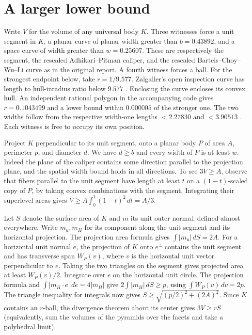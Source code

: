 \section{A larger lower bound}
Write $V$ for the volume of any universal body $K$. Three witnesses force
a unit segment in $K$, a planar curve of planar width greater than
$b=0.43892$, and a space curve of width greater than $w=0.25607$.
These are respectively the segment, the rescaled Adhikari--Pitman caliper,
and the rescaled Bartels--Choy--Wu--Li curve as in the original report.
A fourth witness forces a ball. For the strongest endpoint below, take $r=1/9.577$. Zalgaller's open inspection curve has length to hull-inradius ratio below $9.577$ \cite[p.~125, following Theorem~1.2]{ghomi}. Enclosing the curve encloses its convex hull. An independent rational polygon in the accompanying code gives $r=0.1043499$ and a lower bound within $0.000005$ of the stronger one. The two widths follow from the respective width-one lengths $<2.27830$ and $<3.90513$ \cite{ap,bartels}. Each witness is free to occupy its own position.

Project $K$ perpendicular to its unit segment, onto a planar body $P$
of area $A$, perimeter $p$, and diameter $d$. We have $d\ge b$ and
every width of $P$ is at least $w$. Indeed the plane of the caliper contains
some direction parallel to the projection plane, and the spatial width
bound holds in all directions. To see $3V\ge A$, observe that fibers parallel to the
unit segment have length at least $t$ on a $(1-t)$-scaled copy of $P$,
by taking convex combinations with the segment. Integrating their superlevel areas gives $V\ge A\int_0^1(1-t)^2\,dt=A/3$.

Let $S$ denote the surface area of $K$ and $m$ its unit outer normal,
defined almost everywhere. Write $m_u,m_H$ for its component along
the unit segment and its horizontal projection. The projection area
formula gives $\int|m_u|\,dS=2A$. For a horizontal unit normal $e$, the
projection of $K$ onto $e^\perp$ contains the unit segment and has transverse
span $W_P(v)$, where $v$ is the horizontal unit vector perpendicular to $e$.
Taking the two triangles on the segment gives projected area at least
$W_P(v)/2$. Integrate over $e$ on the horizontal unit circle.
The projection formula and $\int|m_H\cdot e|\,de=4|m_H|$ give
$2\int|m_H|\,dS\ge p$, using $\int W_P(v)\,dv=2p$.
The triangle inequality for integrals now gives
$S\ge\sqrt{(p/2)^2+(2A)^2}$. Since $K$ contains an $r$-ball,
the divergence theorem about its center gives $3V\ge rS$
(equivalently, sum the volumes of the pyramids over the facets and
take a polyhedral limit).


